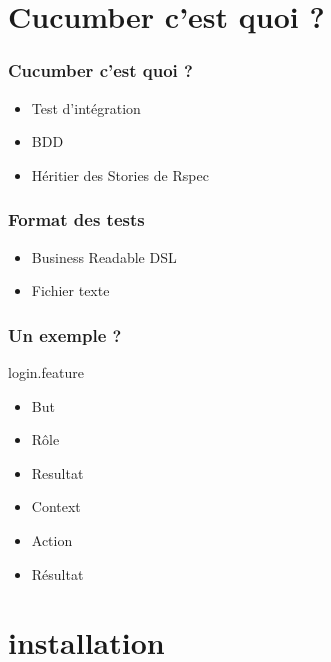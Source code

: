 \documentclass{beamer}
\begin{document}
\section{Cucumber c'est quoi ?}

\begin{frame}
	\frametitle{Cucumber c'est quoi ?}
	\begin{itemize}
    \item Test d'intégration
    \item BDD
    \item Héritier des Stories de Rspec
	\end{itemize}
\end{frame}

\begin{frame}
  \frametitle{Format des tests}
  \begin{itemize}
    \item Business Readable DSL
    \item Fichier texte
  \end{itemize}
\end{frame}

\begin{frame}
  \frametitle{Un exemple ?}
  \begin{beamerboxesrounded}{login.feature}
    
  \end{beamerboxesrounded}
\end{frame}

\begin{frame}
  \begin{itemize}
    \item But
    \item Rôle
    \item Resultat
  \end{itemize}
\end{frame}

\begin{frame}
  \begin{itemize}
    \item Context
    \item Action
    \item R\'esultat
  \end{itemize}
\end{frame}

\section{installation}
\end{document}

